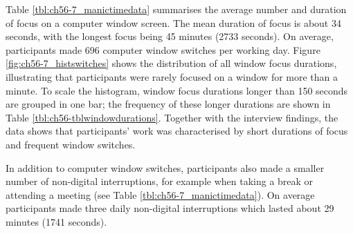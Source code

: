 Table \ref{tbl:ch56-7_manictimedata} summarises the average number and duration of focus on a computer window screen. The mean duration of focus is about 34 seconds, with the longest focus being 45 minutes (2733 seconds). On average, participants made 696  computer window switches per working day. Figure \ref{fig:ch56-7_histswitches} shows the distribution of all window focus durations, illustrating that participants were rarely focused on a window for more than a minute. To scale the histogram, window focus durations longer than 150 seconds are grouped in one bar; the frequency of these longer durations are shown in Table \ref{tbl:ch56-tblwindowdurations}. %
Together with the interview findings, the data shows that participants’ work was characterised by short durations of focus and frequent window switches. %

In addition to computer window switches, participants also made a smaller number of non-digital interruptions, for example when taking a break or attending a meeting (see Table \ref{tbl:ch56-7_manictimedata}). On average participants made three daily non-digital interruptions which lasted about 29 minutes (1741 seconds). 

